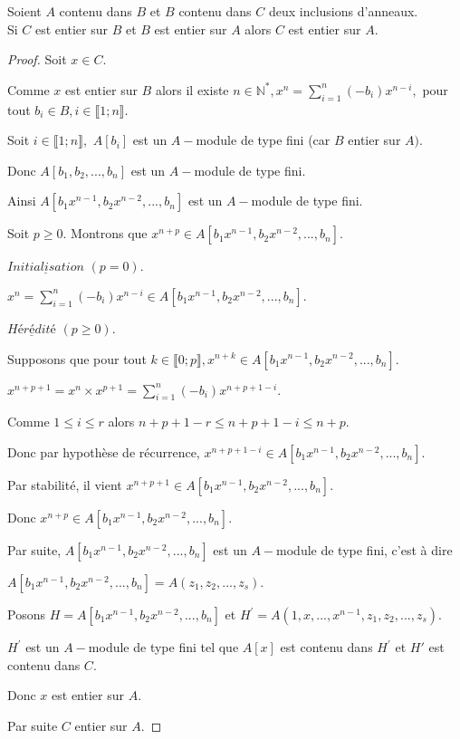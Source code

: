 \begin{moncorollaire}
	Soient $A $ contenu dans $ B$ et $B$ contenu dans $ C $ deux inclusions d'anneaux.\\
	Si $C$ est entier sur $B$ et $B$ est entier sur $A$ alors $C$ est entier sur $A$.
\end{moncorollaire}
\begin{proof}
	Soit $x\in C.$
	
	Comme $x$ est entier sur $B$ alors il existe $n\in \mathbb{N}^{\ast },x^{n}=\sum\limits_{i=1}^{n}(-b_{i})x^{n-i},$ pour tout $b_{i}\in
	B,i\in \llbracket 1; n \rrbracket.$
	
	Soit $i\in \llbracket 1; n \rrbracket,$ $A[b_{i}]$ est un $A-$module de type fini
	(car $B$ entier sur $A).$
	
	Donc $A[b_{1},b_{2},...,b_{n}]$ est un $A-$module de type fini.
	
	Ainsi $A[b_{1}x^{n-1},b_{2}x^{n-2},...,b_{n}]$ est un $A-$module de type
	fini.
	
	Soit $p\geq 0.$ Montrons que $x^{n+p}\in
	A[b_{1}x^{n-1},b_{2}x^{n-2},...,b_{n}].$
	
	$\underline{Initialisation}$ $(p=0).$
	
	$x^{n}=\sum\limits_{i=1}^{n}(-b_{i})x^{n-i}\in
	A[b_{1}x^{n-1},b_{2}x^{n-2},...,b_{n}].$
	
	$\underline{Hérédité}$ $(p\geq 0)$.
	
	Supposons que pour tout $k\in \llbracket 0; p \rrbracket,x^{n+k}\in
	A[b_{1}x^{n-1},b_{2}x^{n-2},...,b_{n}].$
	
	$x^{n+p+1}=x^{n}\times x^{p+1}=\sum\limits_{i=1}^{n}(-b_{i})x^{n+p+1-i}.$
	
	Comme $1\leq i\leq r$ alors $n+p+1-r\leq n+p+1-i\leq n+p.$
	
	Donc par hypothèse de récurrence, $x^{n+p+1-i}\in
	A[b_{1}x^{n-1},b_{2}x^{n-2},...,b_{n}].$
	
	Par stabilité, il vient $x^{n+p+1}\in
	A[b_{1}x^{n-1},b_{2}x^{n-2},...,b_{n}].$
	
	Donc $x^{n+p}\in A[b_{1}x^{n-1},b_{2}x^{n-2},...,b_{n}].$
	
	Par suite, $A[b_{1}x^{n-1},b_{2}x^{n-2},...,b_{n}]$ est un $A-$module de
	type fini, c'est à dire 
	
	$A[b_{1}x^{n-1},b_{2}x^{n-2},...,b_{n}]=A(z_{1},z_{2},...,z_{s}).$
	
	Posons $H=A[b_{1}x^{n-1},b_{2}x^{n-2},...,b_{n}]$ et $H^{\prime
	}=A(1,x,...,x^{n-1},z_{1},z_{2},...,z_{s})$.
	
	$H^{\prime }$ est un $A-$module de type fini tel que $A[x]$ est contenu dans $ H^{\prime
	}$ et $H'$ est contenu dans $ C.$
	
	Donc $x$ est entier sur $A.$
	
	Par suite $C$ entier sur $A.$
\end{proof}
